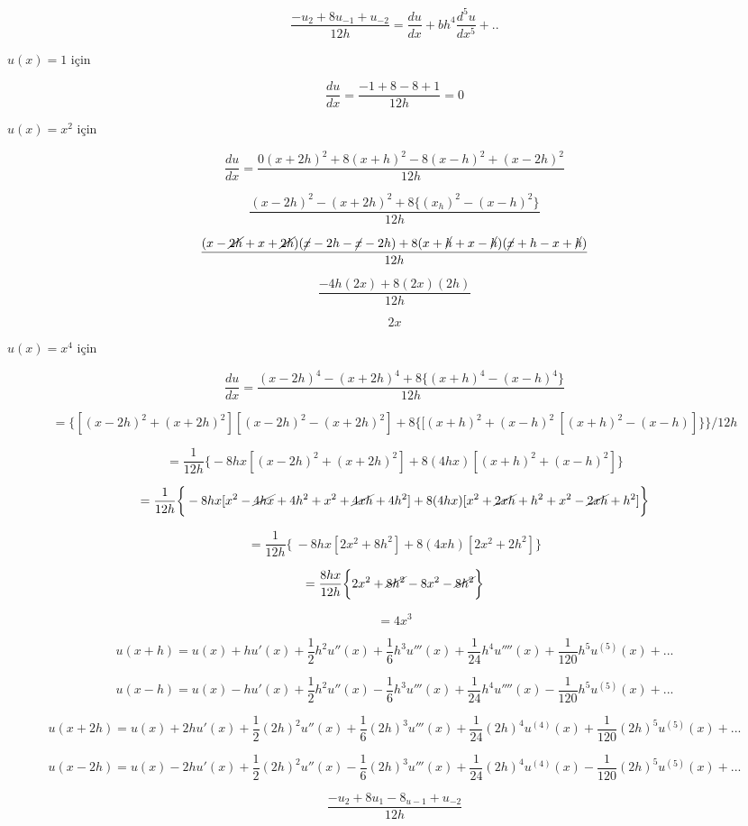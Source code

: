 \documentclass[12pt,fleqn]{article}\usepackage{../../common}
\begin{document}
$$ \frac{-u_2 + 8u_{-1} + u_{-2}}{12h} = \frac{du}{dx} + bh^4 \frac{d^5u}{dx^5}+..$$

$u(x) = 1$ için

$$ \frac{du}{dx} = \frac{-1 + 8 -8 + 1}{12h}  = 0$$

$u(x)=x^2$ için

$$ \frac{du}{dx} = \frac{0(x+2h)^2 + 8(x+h)^2 - 8(x-h)^2 + (x-2h)^2}{12h}$$

$$ \frac{(x-2h)^2 - (x+2h)^2 + 8\{ (x_h)^2 - (x-h)^2\}}{12h} $$

$$ \frac{
  (x-\cancel{2h} + x + \cancel{2h})
  (\cancel{x}-2h-\cancel{x}-2h) +
  8(x + \cancel{h} + x - \cancel{h})
  (\cancel{x} + h - x + \cancel{h})}
{12h}
$$

$$ \frac{-4h(2x) + 8(2x)(2h)}{12h} $$

$$ 2x $$

$u(x) = x^4$ için

$$ \frac{du}{dx} = \frac{(x-2h)^4 - (x+2h)^4 + 8\{ (x+h)^4 - (x-h)^4\}}{12h} $$

$$ =
\bigg\{
    [ (x-2h)^2 + (x+2h)^2 ] [ (x-2h)^2 - (x+2h)^2] +
    8\{ [ (x+h)^2 + (x-h)^2 \ [(x+h)^2 - (x-h)]  \}
\bigg\} / 12h
$$

$$ = \frac{1}{12h} \bigg\{
-8hx [(x-2h)^2 + (x+2h)^2] + 8(4hx)[(x+h)^2 + (x-h)^2]
\bigg\}
$$

$$ = \frac{1}{12h} \bigg\{
-8hx[x^2 - \cancel{4hx} + 4h^2 + x^2 + \cancel{4xh} + 4h^2 ] +
8(4hx)[x^2 + \cancel{2xh} + h^2 + x^2 - \cancel{2xh} + h^2]
\bigg\}
$$

$$ = \frac{1}{12h} \bigg\{\
-8hx [2x^2 + 8h^2] + 8(4xh)[2x^2+ 2h^2]
\bigg\}
$$

$$ = \frac{8hx}{12h} \bigg\{ 2x^2 + \cancel{8h^2} - 8x^2 - \cancel{8h^2} \bigg\}$$

$$ = 4x^3 $$

$$ u(x+h) = u(x) + hu'(x) + \frac{1}{2}h^2u''(x) + \frac{1}{6}h^3u'''(x)+
\frac{1}{24}h^4u''''(x) + \frac{1}{120}h^5u^{(5)} (x) + ...
$$

$$ u(x-h) = u(x) - hu'(x) + \frac{1}{2}h^2u''(x) - \frac{1}{6}h^3 u'''(x) +
\frac{1}{24}h^4u''''(x) - \frac{1}{120}h^5u^{(5)}(x) + ...
$$

$$ u(x+2h) = u(x) + 2hu'(x) + \frac{1}{2}(2h)^2u''(x) + \frac{1}{6}(2h)^3u'''(x)+
\frac{1}{24}(2h)^4 u^{(4)} (x) + \frac{1}{120} (2h)^5 u^{(5)} (x) + ...
$$

$$ u(x-2h) = u(x) - 2hu'(x) + \frac{1}{2}(2h)^2u''(x) -\frac{1}{6}(2h)^3u'''(x)+
\frac{1}{24}(2h)^4 u^{(4)} (x) - \frac{1}{120} (2h)^5 u^{(5)} (x) + ...
$$

$$ \frac{-u_2 + 8u_1 - 8_{u-1} + u_{-2}}{12h} $$
\end{document}
